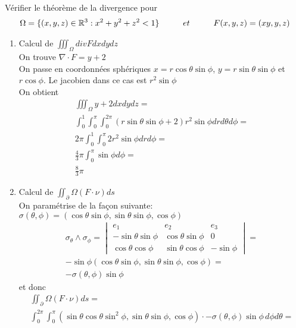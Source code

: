 \begin{myExample}
	Vérifier le théorème de la divergence pour
	\begin{eqnarray*}
		\Omega=\{(x,y,z)\in\R^3:x^2+y^2+z^2<1\}\hspace{10 mm}et\hspace{10 mm}F(x,y,z)=(xy,y,z)
	\end{eqnarray*}

	\begin{enumerate}
		\item 
			Calcul de $\iiint_\Omega divFdxdydz$
			\\
			On trouve $\nabla\cdot F=y+2$
			\\On passe en coordonnées sphériques $x=r\cos\theta\sin\phi$, $y=r\sin\theta\sin\phi$ et $r\cos\phi$. Le jacobien dans ce cas est $r^2\sin\phi$
			\\On obtient
			\begin{eqnarray*}
				\iiint_\Omega y+2dxdydz=
				\\
				\int_0^1\int_0^\pi\int_0^{2\pi} (r\sin\theta\sin\phi+2)r^2\sin\phi drd\theta d\phi=
				\\
				2\pi\int_0^1\int_0^{\pi} 2r^2\sin\phi drd\phi=
				\\
				\frac{4}{3}\pi\int_0^\pi\sin\phi d\phi=
				\\
				\frac{8}{3}\pi
			\end{eqnarray*}
		\item Calcul de $\iint_\partial\Omega (F\cdot\nu)ds$
		\\On paramétrise de la façon suivante: $\sigma(\theta, \phi)=(\cos\theta\sin\phi,\sin\theta\sin\phi,\cos\phi)$
		\begin{eqnarray*}
			\sigma_\theta\wedge\sigma_\phi=
			\begin{vmatrix}
				e_1&e_2&e_3
				\\
				-\sin\theta\sin\phi&\cos\theta\sin\phi&0
				\\
				\cos\theta\cos\phi&\sin\theta\cos\phi&-\sin\phi
			\end{vmatrix}
			=
			\\
			-\sin\phi(\cos\theta\sin\phi,\sin\theta\sin\phi,\cos\phi)=
			\\-\sigma(\theta,\phi)\sin\phi
		\end{eqnarray*}
		et donc
		\begin{eqnarray*}
			\iint_\partial\Omega (F\cdot\nu)ds=
			\\
			\int_0^{2\pi}\int_0^\pi (\sin\theta\cos\theta\sin^2\phi,\sin\theta\sin\phi,\cos\phi)\cdot-\sigma(\theta,\phi)\sin\phi\,d\phi d\theta=

\end{eqnarray*}
\end{enumerate}
\end{myExample}
